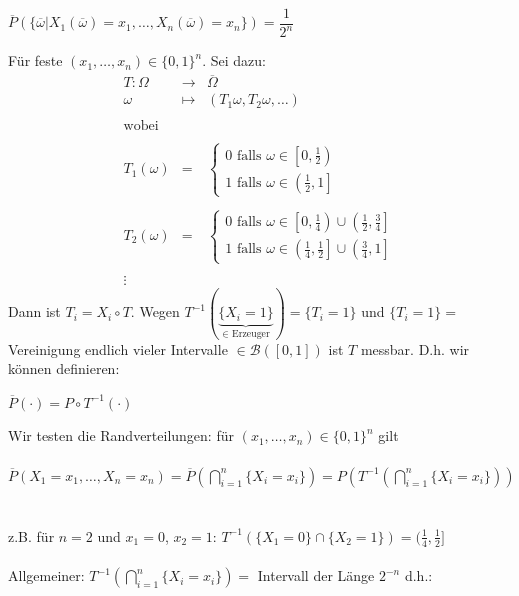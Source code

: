 \documentclass[10pt,a4paper]{report}
\numberwithin{equation}{section}
\numberwithin{figure}{section}
\theoremstyle{plain}
\theoremstyle{definition}
\theoremstyle{plain}
\theoremstyle{definition}
\theoremstyle{remark}
\theoremstyle{plain}
\theoremstyle{plain}
\theoremstyle{plain}
\newcommand{\1}{ \mathbb{1} } %
\begin{document}
\begin{center}
$\overline{P}(\{\overline{\omega}|X_1(\overline{\omega})=x_1,\dots,X_n(\overline{\omega})=x_n\})=\dfrac{1}{2^n}$
\end{center}
Für feste $(x_1,\dots,x_n) \in \{0,1\}^n$. Sei dazu:
\begin{eqnarray*}
T: \Omega &\to& \overline{\Omega}\\
\omega &\mapsto & (T_1\omega, T_2\omega,\dots)\\\\
\text{wobei}\\\\
T_1(\omega)&=&
\begin{cases}
0 \text{ falls } \omega \in \left[0,\frac{1}{2}\right)\\
1 \text{ falls } \omega \in \left(\frac{1}{2},1\right]
\end{cases}\\\\
T_2(\omega)&=&
\begin{cases}
0 \text{ falls } \omega \in \left[0,\frac{1}{4}\right)\cup \left(\frac{1}{2},\frac{3}{4}\right]\\
1 \text{ falls } \omega \in \left(\frac{1}{4},\frac{1}{2}\right]\cup\left(\frac{3}{4},1\right]
\end{cases}\\\\
\vdots
\end{eqnarray*}
Dann ist $T_i=X_i\circ T$. Wegen $T^{-1}(\underbrace{\{X_i=1\}}_{\in \text{ Erzeuger}})=\{T_i=1\}$ und $\{T_i=1\}=$ Vereinigung endlich vieler Intervalle $\in \mathcal{B}([0,1])$ ist $T$ messbar. D.h. wir können definieren:
\begin{center}
$\overline{P}(\cdot)=P\circ T^{-1}(\cdot)$
\end{center}
Wir testen die Randverteilungen: für $(x_1,\dots,x_n) \in \{0,1\}^n$ gilt\\\\
$\overline{P}(X_1=x_1,\dots,X_n=x_n)=\overline{P}\left(\bigcap\limits_{i=1}^n\{X_i=x_i\}\right)=P\left(T^{-1}\left(\bigcap\limits_{i=1}^n\{X_i=x_i\}\right)\right)$\\\\\\
z.B. für $n=2$ und $x_1=0$, $x_2=1$: $T^{-1}(\{X_1=0\}\cap\{X_2=1\})=(\frac{1}{4},\frac{1}{2}]$\\\\
Allgemeiner: $T^{-1}\left(\bigcap\limits_{i=1}^n\{X_i=x_i\}\right)=$ Intervall der Länge $2^{-n}$ d.h.:\\\\
\end{document}
